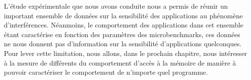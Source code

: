 L'étude expérimentale que nous avons conduite nous a permis de réunir un important ensemble de données sur la sensibilité des applications au phénomène d'interférences.
Néanmoins, le comportement des applications dans cet ensemble étant caractérise en fonction des paramètres des microbenchmarks, ces données ne nous donnent pas d'information sur la sensibilité d'applications quelconques.
Pour lever cette limitation, nous allons, dans le prochain chapitre, nous intéresser à la mesure de différents du comportement d'accès à la mémoire de manière à pouvoir caractériser le comportement de n’importe quel programme.  
